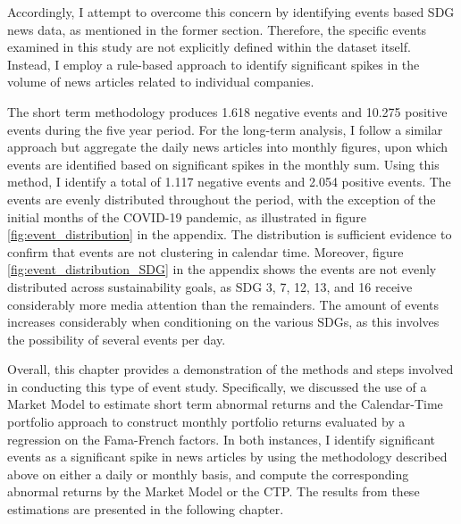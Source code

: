Accordingly, I attempt to overcome this concern by identifying events based SDG news data, as mentioned in the former section. Therefore, the specific events examined in this study are not explicitly defined within the dataset itself. Instead, I employ a rule-based approach to identify significant spikes in the volume of news articles related to individual companies. 

The short term methodology produces 1.618 negative events and 10.275 positive events during the five year period. For the long-term analysis, I follow a similar approach but aggregate the daily news articles into monthly figures, upon which events are identified based on significant spikes in the monthly sum. Using this method, I identify a total of 1.117 negative events and 2.054 positive events. The events are evenly distributed throughout the period, with the exception of the initial months of the COVID-19 pandemic, as illustrated in figure \ref{fig:event_distribution} in the appendix. The distribution is sufficient evidence to confirm that events are not clustering in calendar time. Moreover, figure \ref{fig:event_distribution_SDG} in the appendix shows the events are not evenly distributed across sustainability goals, as SDG 3, 7, 12, 13, and 16 receive considerably more media attention than the remainders. The amount of events increases considerably when conditioning on the various SDGs, as this involves the possibility of several events per day. 

Overall, this chapter provides a demonstration of the methods and steps involved in conducting this type of event study. 
Specifically, we discussed the use of a Market Model to estimate short term abnormal returns and the Calendar-Time portfolio approach to construct monthly portfolio returns evaluated by a regression on the Fama-French factors. In both instances, I identify significant events as a significant spike in news articles by using the methodology described above on either a daily or monthly basis, and compute the corresponding abnormal returns by the Market Model or the CTP. The results from these estimations are presented in the following chapter. 